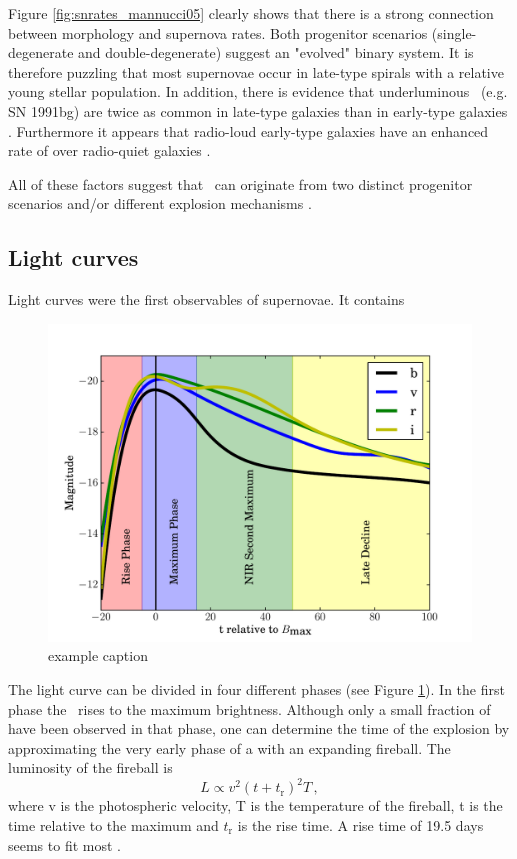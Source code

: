 Figure \ref{fig:snrates_mannucci05} clearly shows that there is a strong connection between morphology and supernova rates. 
Both progenitor scenarios (single-degenerate and double-degenerate) suggest an "evolved" binary system. It is therefore puzzling that most supernovae occur in late-type spirals with a relative young stellar population. 
In addition, there is evidence that underluminous \sneia\ (e.g. SN 1991bg) are twice as common in late-type galaxies than in early-type galaxies \citep{2001ApJ...554L.193H}. 
Furthermore it appears that radio-loud early-type galaxies have an enhanced rate of \sneia over radio-quiet galaxies \citep{2003ApJ...587L..71D}. 

All of these factors suggest that \sneia\ can originate from two distinct progenitor scenarios and/or different explosion mechanisms \citep{1994ApJ...423L..31D,  1995ApJ...447L..69R}.

\subsection{Light curves} 
Light curves were the first observables of supernovae. It contains


\begin{figure}[htbp] %
   \centering
   \includegraphics[width=\textwidth]{chapter_intro/plots/lightcurve_2002bo.pdf} 
   \caption{example caption}
   \label{fig:lightcurve_2002bo}
\end{figure}

The light curve can be divided in four different phases (see Figure \ref{fig:lightcurve_2002bo}). In the first phase the \sneia\  rises to the maximum brightness. Although only a small fraction of \sneia have been observed in that phase, one can determine the time of the explosion by approximating the very early phase of a \sneia with an expanding fireball. The luminosity of the fireball is 
\[L\propto v^2 (t+t_\textrm{r})^2 T\,,\]
where v is the photospheric velocity, T is the temperature of the fireball, t is the time relative to the maximum and $t_\textrm{r}$ is the rise time. A rise time of 19.5 days \citep{1999AJ....118.2675R} seems to fit most \sneia. 

